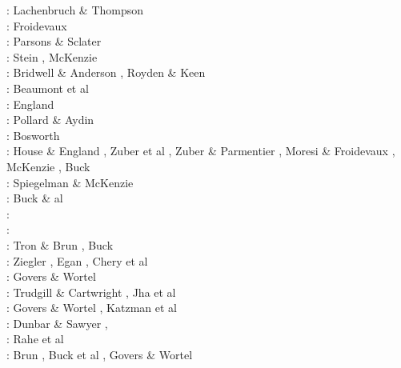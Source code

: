 \begin{scriptsize}
\nineteenseventytwo: Lachenbruch \& Thompson \cite{lath72}\\
\nineteenseventythree: Froidevaux \cite{froi73}\\
\nineteenseventyseven: Parsons \& Sclater \cite{pasc77}\\
\nineteenseventyeight: Stein \cite{stei78}, McKenzie \cite{mcke78}\\
\nineteeneighty: Bridwell \& Anderson \cite{bran80}, Royden \& Keen \cite{roke80}\\
\nineteeneightytwo: Beaumont et al \cite{bekb82}\\
\nineteeneightythree: England \cite{engl83}\\
\nineteeneightyfour: Pollard \& Aydin \cite{poay84}\\
\nineteeneightyfive: Bosworth \cite{bosw85}\\
\nineteeneightysix: House \& England \cite{hoen86b}, Zuber et al \cite{zupf86}, 
                    Zuber \& Parmentier \cite{zupa86}, Moresi \& Froidevaux \cite{mofr86},
                    McKenzie \cite{mcke86}, Buck \cite{buck86}\\
\nineteeneightyseven: Spiegelman \& McKenzie \cite{spmc87}\\
\nineteeneightyeight: Buck \& al \cite{bums88}\\
\nineteeneightynine: \cite{mewi89}\cite{brbe89}\cite{ismb89}\cite{soen89}\cite{brbe89b}\cite{brbe89c}\\
\nineteenninety: \cite{fara90}\cite{lipa90}\cite{mccl90}\cite{chmo90}\cite{chmo90b}\\
\nineteenninetyone: Tron \& Brun \cite{trbr91}, Buck \cite{buck91}\\
\nineteenninetytwo: Ziegler \cite{zieg92b}, Egan \cite{egan92}, Chery et al \cite{chld92}\\
\nineteenninetythree: Govers \& Wortel \cite{gowo93}\\
\nineteenninetyfour: Trudgill \& Cartwright \cite{trca94}, Jha et al \cite{jhpp94}\\
\nineteenninetyfive: Govers \& Wortel \cite{gowo95}, Katzman et al \cite{katl95}\\
\nineteenninetysix: Dunbar \& Sawyer \cite{dusa96}, \cite{beda96}\cite{mada96}\\
\nineteenninetyeight: Rahe et al \cite{rafm98}\\
\nineteenninetynine: Brun \cite{brun99}, Buck et al \cite{bulp99}, Govers \& Wortel \cite{gowo99}\\

\end{scriptsize}
